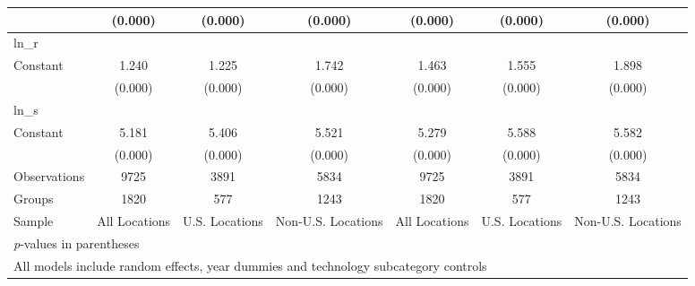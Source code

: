 \begin{table}[htbp]
\begin{tabular}{l*{6}{c}}
                &  (0.000)&  (0.000)&  (0.000)&  (0.000)&  (0.000)&  (0.000)\\
\hline
ln\_r            &         &         &         &         &         &         \\
Constant        &    1.240&    1.225&    1.742&    1.463&    1.555&    1.898\\
                &  (0.000)&  (0.000)&  (0.000)&  (0.000)&  (0.000)&  (0.000)\\
\hline
ln\_s            &         &         &         &         &         &         \\
Constant        &    5.181&    5.406&    5.521&    5.279&    5.588&    5.582\\
                &  (0.000)&  (0.000)&  (0.000)&  (0.000)&  (0.000)&  (0.000)\\
\hline
Observations    &     9725&     3891&     5834&     9725&     3891&     5834\\
Groups          &     1820&      577&     1243&     1820&      577&     1243\\
Sample          &All Locations&U.S. Locations&Non-U.S. Locations&All Locations&U.S. Locations&Non-U.S. Locations\\
\hline\hline
\multicolumn{7}{l}{\footnotesize \textit{p}-values in parentheses}\\
\multicolumn{7}{l}{\footnotesize All models include random effects, year dummies and technology subcategory controls}\\
\end{tabular}
\end{table}
